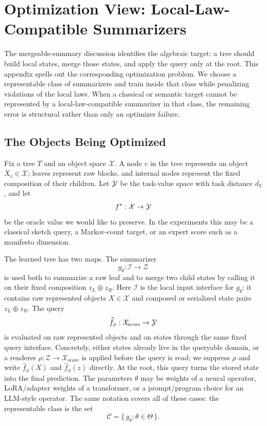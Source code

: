 \section{Optimization View: Local-Law-Compatible Summarizers}
\label{app:v7-optimization-projection}

The mergeable-summary discussion identifies the algebraic target: a tree
should build local states, merge those states, and apply the query only at the
root. This appendix spells out the corresponding optimization problem.
We choose a representable class of summarizers and train inside that
class while penalizing violations of the local laws. When a classical
or semantic target cannot be represented by a local-law-compatible
summarizer in that class, the remaining error is structural rather than
only an optimizer failure.

\subsection{The Objects Being Optimized}
\label{app:v7-optimization-objects}

Fix a tree \(T\) and an object space \(\mathcal X\). A node \(v\) in
the tree represents an object \(X_v\in\mathcal X\); leaves represent
raw blocks, and internal nodes represent the fixed composition of their
children. Let \(\mathcal{Y}\) be the task-value space with task distance
\(d_Y\), and let
\[
  f^\ast:\mathcal X\to \mathcal{Y}
\]
be the oracle value we would like to preserve. In the experiments this
may be a classical sketch query, a Markov-count target, or an expert
score such as a manifesto dimension.

The learned tree has two maps. The summarizer
\[
  g_\theta:\mathcal I\to \mathcal Z
\]
is used both to summarize a raw leaf and to merge two child states by
calling it on their fixed composition \(z_L\oplus z_R\). Here
\(\mathcal I\) is the local input interface for \(g_\theta\): it
contains raw represented objects \(X\in\mathcal X\) and composed or
serialized state pairs \(z_L\oplus z_R\). The query
\[
  \widehat f_\phi:\mathcal X_{\mathrm{score}}\to\mathcal{Y}
\]
is evaluated on raw represented objects and on states through the same
fixed query interface. Concretely, either states already live in the
queryable domain, or a renderer
\(\rho:\mathcal Z\to\mathcal X_{\mathrm{score}}\) is applied before
the query is read; we suppress \(\rho\) and write
\(\widehat f_\phi(X)\) and \(\widehat f_\phi(z)\) directly. At the
root, this query turns the stored state into the final prediction.
The parameters
\(\theta\) may be weights of a neural operator, LoRA/adapter weights of
a transformer, or a prompt/program choice for an LLM-style operator. The
same notation covers all of these cases: the representable class is the
set
\[
  \mathcal C
  =
  \{\,g_\theta:\theta\in\Theta\,\}.
\]


